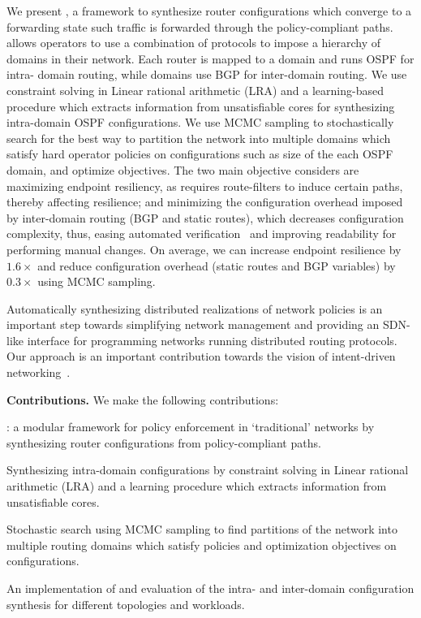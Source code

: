 We present \name, 
a framework to synthesize router configurations which 
converge to a forwarding state such traffic is
forwarded through the policy-compliant paths. 
\name allows operators to use a combination of 
protocols to impose a hierarchy of domains in their network.
Each router is mapped to a domain and runs OSPF for intra-
domain routing, while domains use BGP for inter-domain
routing. We use constraint solving in Linear rational 
arithmetic (LRA) and a learning-based procedure which 
extracts information from unsatisfiable cores 
for synthesizing intra-domain OSPF configurations. 
We use MCMC sampling to stochastically search for 
the best way to partition the network into multiple 
domains which satisfy hard operator policies on configurations
such as size of the each OSPF domain, and optimize objectives.
The two main objective \name considers are 
maximizing endpoint resiliency, as \name requires
route-filters to induce certain paths, thereby affecting resilience; 
and minimizing the configuration overhead imposed by 
inter-domain routing (BGP and static routes), which 
decreases configuration complexity, thus, easing
 automated verification~\cite{batfish, arc, era} and 
 improving readability 
 for performing manual changes.
On average, we can increase endpoint resilience
by $1.6\times$ and reduce configuration overhead (static routes
and BGP variables) by $0.3\times$ using MCMC sampling. 


Automatically synthesizing distributed realizations 
of network policies is an
important step towards simplifying 
network management and providing an 
SDN-like interface for programming networks 
running distributed routing protocols. 
Our approach is an important
contribution towards the vision of 
intent-driven networking~\cite{intent}.

\noindent\textbf{Contributions.} We make the following contributions:
\begin{compactitemize}
	\item \name: a modular framework 
	for policy enforcement in `traditional' networks
	by synthesizing router configurations from policy-compliant paths. 
	\item Synthesizing intra-domain configurations by
	constraint solving in Linear rational arithmetic (LRA) and 
	a learning procedure which extracts information from 
	unsatisfiable cores. 
	\item Stochastic search using MCMC sampling to find 
	partitions of the network into multiple routing domains which
	satisfy policies and optimization objectives on configurations.
	\item An implementation of \name and evaluation of the 
	intra- and inter-domain configuration synthesis for different
	topologies and workloads. 
\end{compactitemize}